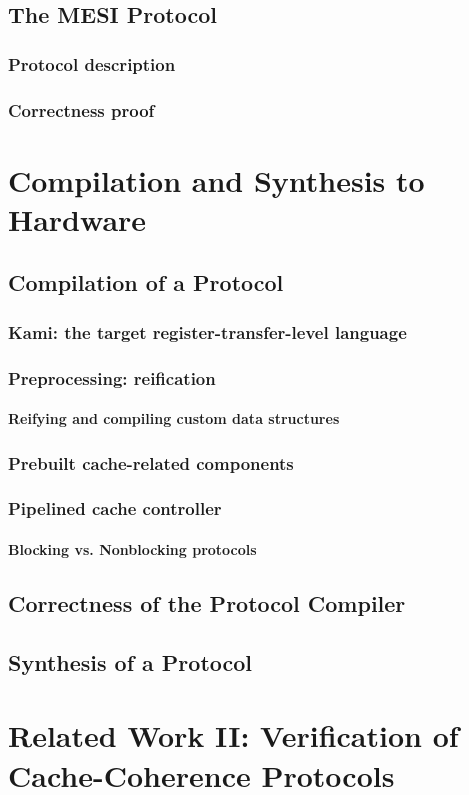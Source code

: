 \section{The MESI Protocol}
\label{sec-mesi-protocol}

\subsection{Protocol description}

\subsection{Correctness proof}
\label{sec-mesi-proof}

\chapter{Compilation and Synthesis to Hardware}

\section{Compilation of a \hemiola{} Protocol}
\label{sec-compiler}

\subsection{Kami: the target register-transfer-level language}

\subsection{Preprocessing: reification}

\subsubsection{Reifying and compiling custom data structures}

\subsection{Prebuilt cache-related components}

\subsection{Pipelined cache controller}

\subsubsection{Blocking vs. Nonblocking protocols}

\section{Correctness of the Protocol Compiler}

\section{Synthesis of a \hemiola{} Protocol}
\label{sec-synthesis-protocol}

\chapter{Related Work II: Verification of Cache-Coherence Protocols}

